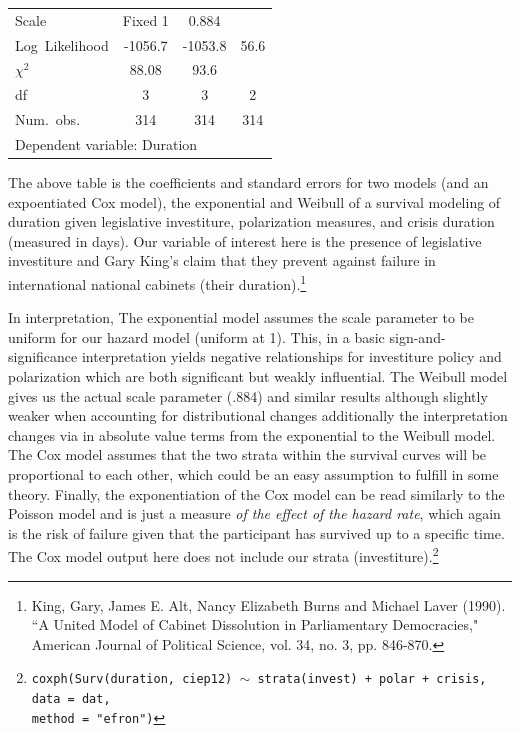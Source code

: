 \documentclass[12pt]{article}\usepackage[]{graphicx}\usepackage[]{color}
\begin{document}
\begin{flushleft}
\begin{table}[h!]
\begin{center}
\begin{tabular}{l c c c }
\hline
Scale              & Fixed 1   & 0.884     &         \\
Log\ Likelihood    & -1056.7   & -1053.8   & 56.6    \\
$\chi^2$           & 88.08     & 93.6      &         \\
df                 &  3        &   3       & 2       \\
Num.\ obs.         & 314       & 314       & 314     \\
\hline
\multicolumn{4}{l}{\scriptsize{Dependent variable: Duration}}
\end{tabular}
\end{center}
\end{table}

The above table is the coefficients and standard errors for two models (and an expoentiated Cox model), the exponential and Weibull of a survival modeling of duration given legislative investiture, polarization measures, and crisis duration (measured in days). Our variable of interest here is the presence of legislative investiture and Gary King's claim that they prevent against failure in international national cabinets (their duration).\footnote{King, Gary, James E. Alt, Nancy Elizabeth Burns and Michael Laver (1990). ``A United Model of Cabinet Dissolution in Parliamentary Democracies," American Journal of Political Science, vol. 34, no. 3, pp. 846-870.}

In interpretation, The exponential model assumes the scale parameter to be uniform for our hazard model (uniform at 1). This, in a basic sign-and-significance interpretation yields negative relationships for investiture policy and polarization which are both significant but weakly influential. The Weibull model gives us the actual scale parameter (.884) and similar results although slightly weaker when accounting for distributional changes additionally the interpretation changes via in absolute value terms from the exponential to the Weibull model. The Cox model assumes that the two strata within the survival curves will be proportional to each other, which could be an easy assumption to fulfill in some theory. Finally, the exponentiation of the Cox model can be read similarly to the Poisson model and is just a measure \textit{of the effect of the hazard rate}, which again is the risk of failure given that the participant has survived up to a specific time. The Cox model output here does not include our strata (investiture).\footnote{\texttt{coxph(Surv(duration, ciep12) $\sim$ strata(invest) + polar + crisis, data = dat,\\
 method = "efron")}}



\end{flushleft}
\end{document}
